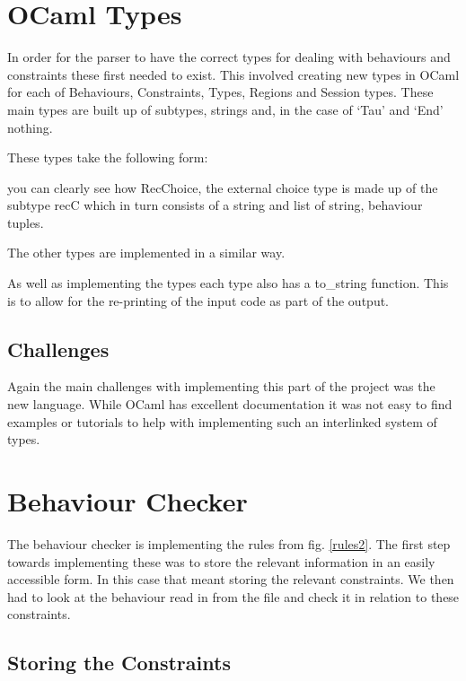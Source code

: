 \section{OCaml Types}

In order for the parser to have the correct types for dealing with behaviours and constraints these first needed to exist. This involved creating new types in OCaml for each of Behaviours, Constraints, Types, Regions and Session types. These main types are built up of subtypes, strings and, in the case of `Tau' and `End' nothing. 

These types take the following form: 



you can clearly see how RecChoice, the external choice type is made up of the subtype recC which in turn consists of a string and list of string, behaviour tuples. 

The other types are implemented in a similar way. 

As well as implementing the types each type also has a to_string function. This is to allow for the re-printing of the input code as part of the output. 

\subsection{Challenges}

Again the main challenges with implementing this part of the project was the new language. While OCaml has excellent documentation it was not easy to find examples or tutorials to help with implementing such an interlinked system of types. 

\section{Behaviour Checker}

The behaviour checker is implementing the rules from fig. \ref{rules2}. The first step towards implementing these was to store the relevant information in an easily accessible form. In this case that meant storing the relevant constraints. We then had to look at the behaviour read in from the file and check it in relation to these constraints. 

\subsection{Storing the Constraints}

